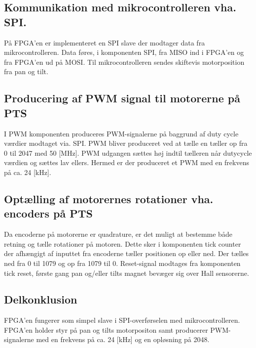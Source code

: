 \subsection[Kommunikation]{Kommunikation med mikrocontrolleren vha. SPI.}
På FPGA'en er implementeret en SPI slave der modtager data fra 
mikrocontrolleren. Data føres, i komponenten SPI, fra MISO ind i FPGA'en og fra FPGA'en ud på 
MOSI. Til mikrocontrolleren sendes skiftevis motorposition fra pan og tilt.

\subsection{Producering af PWM signal til motorerne på PTS}
I PWM komponenten produceres PWM-signalerne på baggrund af duty cycle værdier modtaget via. SPI. 
PWM bliver produceret ved at tælle en tæller op fra 0 til 2047 med 50 [MHz].
PWM udgangen sættes høj indtil tælleren når dutycycle værdien og sættes lav 
ellers. Hermed er der produceret et PWM med en frekvens på ca. 24 [kHz].

\subsection{Optælling af motorernes rotationer vha. encoders på PTS}
Da encoderne på motorerne er quadrature,
er det muligt at bestemme både retning og tælle rotationer på motoren. 
Dette sker i komponenten tick counter der afhængigt af inputtet fra encoderne tæller positionen op eller 
ned.
Der tælles ned fra 0 til 1079 og op fra 1079 til 0.
Reset-signal modtages fra komponenten tick reset, første gang pan og/eller tilts magnet bevæger 
sig over Hall sensorerne.

\subsection{Delkonklusion}
FPGA'en fungerer som simpel slave i SPI-overførselen med mikrocontrolleren.
FPGA'en holder styr på pan og tilts motorpositon samt producerer PWM-signalerne 
med en frekvens på ca. 24 [kHz] og en opløsning på 2048.